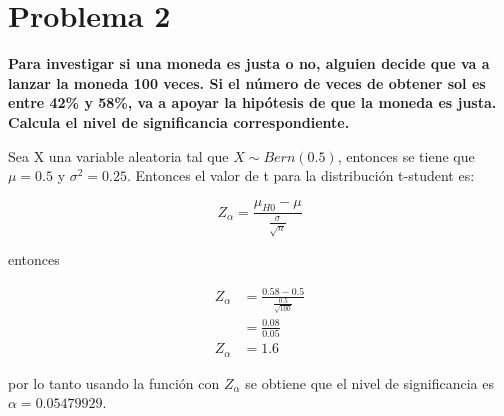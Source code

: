 \section*{Problema 2}

\textbf{Para investigar si una moneda es justa o no, alguien decide que va a lanzar la moneda 100 veces. Si el número de veces de obtener sol es entre 42\% y 58\%, va a apoyar la hipótesis de que la moneda es justa. Calcula el nivel de significancia correspondiente.}


Sea X una variable aleatoria tal que $X\sim Bern(0.5)$, entonces se tiene que $\mu=0.5$ y $\sigma^2 = 0.25$. Entonces el valor de  t para la distribución t-student es:

\begin{equation*}
    Z_{\alpha} = \frac{\mu_{H0}-\mu}{\frac{\sigma}{\sqrt{n}}}
\end{equation*}

entonces

\begin{align*}
    Z_{\alpha} & = \frac{0.58-0.5}{\frac{0.5}{\sqrt{100}}} \\
               & = \frac{0.08}{0.05}                       \\
    Z_{\alpha} & = 1.6
\end{align*}

por lo tanto usando la función  con $Z_{\alpha}$ se obtiene que el nivel de significancia es $\alpha=0.05479929$.